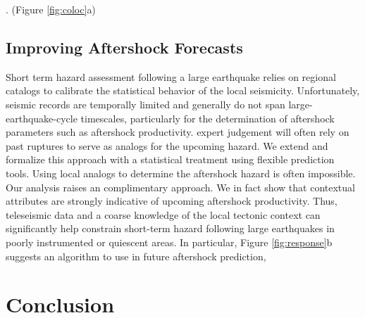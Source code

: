 \documentclass[draft, jgrga]{agujournal2018}
\begin{document}
 \citep{Ben-Zion2006AnalysisRheology, Zaliapin2016AClusters}. (Figure \ref{fig:coloc}a)  %
    
\subsection{Improving Aftershock Forecasts}
 
Short term hazard assessment following a large earthquake relies on regional catalogs to calibrate the statistical behavior of the local seismicity. Unfortunately, seismic records are temporally limited and generally do not span large-earthquake-cycle timescales, particularly for the determination of aftershock parameters such as aftershock productivity.  expert judgement will often rely on past ruptures to serve as analogs for the upcoming hazard. We extend and formalize this approach with a statistical treatment using flexible prediction tools. Using local analogs to determine the aftershock hazard is often impossible. Our analysis raises an complimentary approach. We in fact show that contextual attributes are strongly indicative of upcoming aftershock productivity. Thus, teleseismic data and a coarse knowledge of the local tectonic context can significantly help constrain short-term hazard following large earthquakes in poorly instrumented or quiescent areas. In particular, Figure \ref{fig:response}b suggests an algorithm to use in future aftershock prediction, 

\section{Conclusion}
\end{document}
